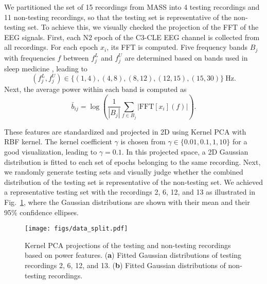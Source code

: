 \documentclass[conference]{IEEEtran}
\begin{document}
We partitioned the set of 15 recordings from MASS into 4 testing recordings and 11 non-testing recordings, so that the testing set is representative of the non-testing set. To achieve this, we visually checked the projection of the FFT of the EEG signals. First, each N2 epoch of the C3-CLE EEG channel is collected from all recordings. For each epoch $x_i$, its FFT is computed. Five frequency bands $B_j$ with frequencies $f$ between $f^L_j$ and $f^U_j$ are determined based on bands used in sleep medicine \cite{berry2012aasm}, leading to
\begin{equation}
(f^L_j, f^U_j) \in \{(1,4), (4,8), (8,12), (12,15), (15,30)\}~\text{Hz}.
\label{eq:freq_band_limits}
\end{equation}Next, the average power within each band is computed as
\begin{equation}
    \bar{b}_{ij} = \log\left(\frac{1}{|B_j|}\sum_{f\in B_j} |\text{FFT}[x_i](f)| \right).
    \label{eq:average_power}
\end{equation}

These features are standardized and projected in 2D using Kernel PCA \cite{scholkopf1997kernel} with RBF kernel. The kernel coefficient $\gamma$ is chosen from $\gamma\in\{0.01, 0.1, 1, 10\}$ for a good visualization, leading to $\gamma=0.1$. In this projected space, a 2D Gaussian distribution is fitted to each set of epochs belonging to the same recording. Next, we randomly generate testing sets and visually judge whether the combined distribution of the testing set is representative of the non-testing set. We achieved a representative testing set with the recordings 2, 6, 12, and 13 as illustrated in Fig.~\ref{fig:data_split}, where the Gaussian distributions are shown with their mean and their 95\% confidence ellipses.

\begin{figure}[tbp]
\centering \texttt{[image: figs/data\_split.pdf]}
  \caption{Kernel PCA projections of the testing and non-testing recordings based on power features. (\textbf{a}) Fitted Gaussian distributions of testing recordings 2, 6, 12, and 13. (\textbf{b}) Fitted Gaussian distributions of non-testing recordings.}
  \label{fig:data_split}
\end{figure}









\end{document}
